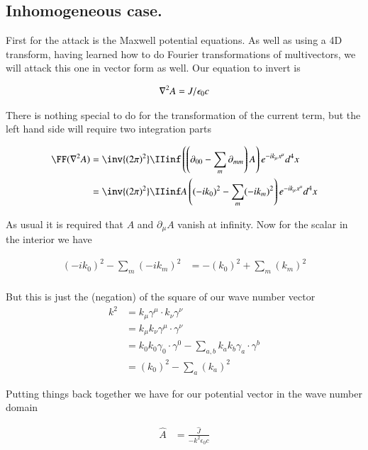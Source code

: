 \subsection{Inhomogeneous case. } 

First for the attack is the Maxwell potential equations.  As well as using a 4D transform, having learned how to do Fourier
transformations of multivectors, we will attack this one in vector form as well.  Our equation to invert is

\begin{align*}
\nabla^2 A = J/\epsilon_0 c
\end{align*}

There is nothing special to do for the transformation of the current term, but the left hand side will require two integration
parts

\begin{align*}
\FF(\grad^2 A )
&= \inv{(2 \pi)^2} \IIinf \left(\left(\partial_{00} - \sum_m \partial_{mm}\right) A \right) e^{ -i k_\mu x^\mu } d^4 x \\
&= \inv{(2 \pi)^2} \IIinf A \left( (-i k_0)^2 - \sum_m (-i k_m)^2 \right) e^{ -i k_\mu x^\mu } d^4 x \\
\end{align*}

As usual it is required that $A$ and $\partial_\mu A$ vanish at infinity.  Now for the scalar in the interior we have

\begin{align*}
(-i k_0)^2 - \sum_m (-i k_m)^2 
&= -(k_0)^2 + \sum_m (k_m)^2 \\
\end{align*}

But this is just the (negation) of the square of our wave number vector
\begin{align*}
k^2 
&= k_\mu \gamma^\mu \cdot k_\nu \gamma^\nu \\
&= k_\mu k_\nu \gamma^\mu \cdot \gamma^\nu \\
&= 
k_0 k_0 \gamma_0 \cdot \gamma^0 
-\sum_{a,b} k_a k_b \gamma_a \cdot \gamma^b \\
&= (k_0)^2 - \sum_a (k_a)^2
\end{align*}

Putting things back together we have for our potential vector in the wave number domain

\begin{align*}
\hat{A} &= \frac{\hat{J}}{- k^2 \epsilon_0 c}
\end{align*}


